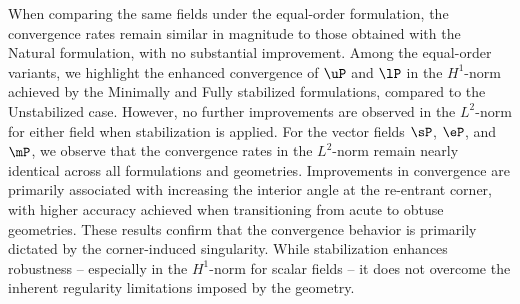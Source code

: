 When comparing the same fields under the equal-order formulation, the convergence rates remain similar in magnitude to those obtained with the Natural formulation, with no substantial improvement. Among the equal-order variants, we highlight the enhanced convergence of $ \uP $ and $ \lP $ in the $ H^1 $-norm achieved by the Minimally and Fully stabilized formulations, compared to the Unstabilized case. However, no further improvements are observed in the $ L^2 $-norm for either field when stabilization is applied.
For the vector fields $ \sP$, $ \eP $, and $ \mP $, we observe that the convergence rates in the $ L^2 $-norm remain nearly identical across all formulations and geometries. Improvements in convergence are primarily associated with increasing the interior angle at the re-entrant corner, with higher accuracy achieved when transitioning from acute to obtuse geometries. 
These results confirm that the convergence behavior is primarily dictated by the corner-induced singularity. While stabilization enhances robustness -- especially in the $H^1$-norm for scalar fields -- it does not overcome the inherent regularity limitations imposed by the geometry. 
